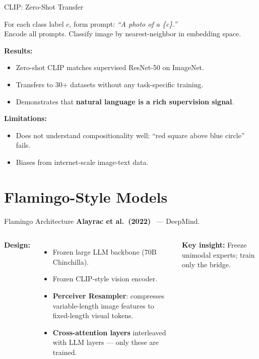 \documentclass[aspectratio=169,10pt]{beamer}
\begin{document}
\begin{frame}{CLIP: Zero-Shot Transfer}
  \begin{tcolorbox}[hitbox, title=Zero-Shot Classification]
    For each class label $c$, form prompt: \textit{``A photo of a \{c\}.''}\\
    Encode all prompts. Classify image by nearest-neighbor in embedding space.
  \end{tcolorbox}
  \vspace{0.4em}
  \textbf{Results:}
  \begin{itemize}
    \item Zero-shot CLIP matches supervised ResNet-50 on ImageNet.
    \item Transfers to 30+ datasets without any task-specific training.
    \item Demonstrates that \textbf{natural language is a rich supervision signal}.
  \end{itemize}
  \vspace{0.3em}
  \textbf{Limitations:}
  \begin{itemize}
    \item Does not understand compositionality well: ``red square above blue circle'' fails.
    \item Biases from internet-scale image-text data.
  \end{itemize}
\end{frame}

\section{Flamingo-Style Models}

\begin{frame}{Flamingo Architecture}
  \textbf{Alayrac et al.\ (2022)}~\cite{alayrac2022flamingo} — DeepMind.
  \vspace{0.4em}
  \begin{columns}[T]
      \textbf{Design:}
      \begin{itemize}
        \item Frozen large LLM backbone (70B Chinchilla).
        \item Frozen CLIP-style vision encoder.
        \item \textbf{Perceiver Resampler}: compresses variable-length image features to fixed-length visual tokens.
        \item \textbf{Cross-attention layers} interleaved with LLM layers — only these are trained.
      \end{itemize}
      \vspace{0.3em}
      \textbf{Key insight:} Freeze unimodal experts; train only the bridge.
  \end{columns}
\end{frame}
\end{document}
